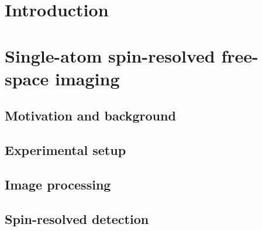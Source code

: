 \documentclass[twoside]{article}
\begin{document}




 \newpage
 \newpage


 \newpage


\newpage
\section{Introduction} \label{sec:intro}


\newpage
\section{Single-atom spin-resolved free-space imaging} \label{sec:imaging}

\subsection{Motivation and background}

\subsection{Experimental setup}

\subsection{Image processing}

\subsection{Spin-resolved detection}


\newpage
\end{document}
